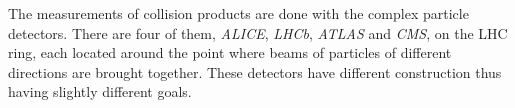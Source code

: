 
The measurements of collision products are done with the complex particle detectors. There are four of them, 
\textit{ALICE}, \textit{LHCb}, \textit{ATLAS} and \textit{CMS}, on the LHC
ring, each located around the point where beams of particles of different directions are brought together.
These detectors have different construction thus having slightly different goals.

